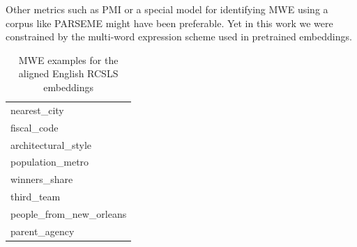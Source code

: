 \documentclass[conference]{IEEEtran}
\begin{document}
	Other metrics such as PMI \cite{bouma2009normalized} or a special model for identifying MWE using a corpus like PARSEME \cite{savary2018parseme} might have been preferable. Yet in this work we were constrained by the multi-word expression scheme used in pretrained embeddings.
	\begin{table}[!htbp]
		\small
		\caption{MWE examples for the aligned English RCSLS embeddings}
		\label{mwe-wiki}		
		\centering
		\begin{tabular}{|l|}
			\hline
			nearest\_city \\
			fiscal\_code \\
			architectural\_style \\
			population\_metro \\
			winners\_share \\
			third\_team \\
			people\_from\_new\_orleans \\
			parent\_agency \\
			\hline
		\end{tabular}
	\end{table}
	
\end{document}
